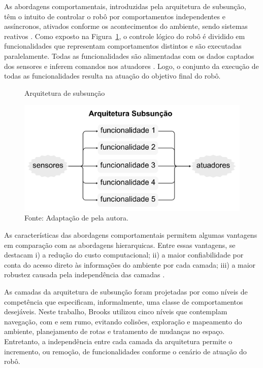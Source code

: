 As abordagens comportamentais, introduzidas pela arquitetura de subsunção, têm o intuito de controlar o robô por comportamentos independentes e assíncronos, ativados conforme os acontecimentos do ambiente, sendo sistemas reativos \cite{seqlam:2020, toroco:2022}. Como exposto na Figura~\ref{fig:subsuncao}, o controle lógico do robô é dividido em funcionalidades que representam comportamentos distintos e são executadas paralelamente. Todas as funcionalidades são alimentadas com os dados captados dos sensores e inferem comandos nos atuadores \cite{seqlam:2020,brooks85}. Logo, o conjunto da execução de todas as funcionalidades resulta na atuação do objetivo final do robô.

\begin{figure}[h]
    \centering
    \caption{Arquitetura de subsunção}
    \includegraphics[scale=0.3]{subsuncao.png}
    \caption*{Fonte: Adaptação de \citet{brooks85} pela autora.}
    \label{fig:subsuncao}
\end{figure}

As características das abordagens comportamentais permitem algumas vantagens em comparação com as abordagens hierarquicas. Entre essas vantagens, se destacam i) a redução do custo computacional; ii) a maior confiabilidade por conta do acesso direto às informações do ambiente por cada camada; iii) a maior robustez causada pela independência das camadas \cite{seqlam:2020,brooks85, toroco:2022}. 

As camadas da arquitetura de subsunção foram projetadas por \citet{brooks85} como níveis de competência que especificam, informalmente, uma classe de comportamentos desejáveis. Neste trabalho, Brooks utilizou cinco níveis que contemplam navegação, com e sem rumo, evitando colisões, exploração e mapeamento do ambiente, planejamento de rotas e tratamento de mudanças no espaço. Entretanto, a independência entre cada camada da arquitetura permite o incremento, ou remoção, de funcionalidades conforme o cenário de atuação do robô. 

